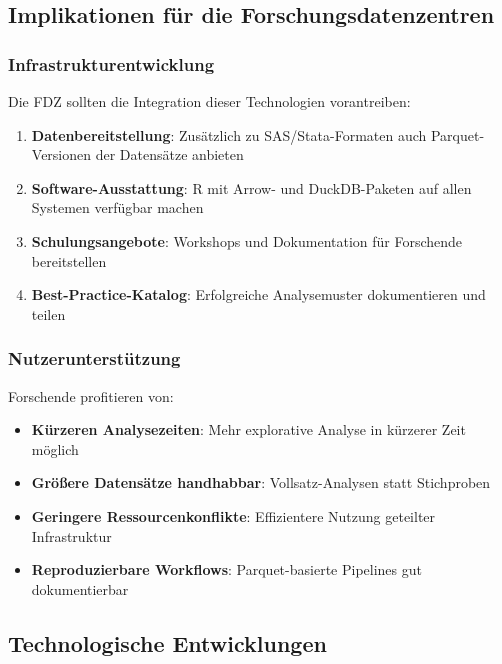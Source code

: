 \documentclass[
  ngerman,
  10pt,
  twocolumn]{article}
\providecommand{\tightlist}{%
  \setlength{\itemsep}{0pt}\setlength{\parskip}{0pt}}
\begin{document}
\subsection{Implikationen für die
Forschungsdatenzentren}\label{implikationen-fuxfcr-die-forschungsdatenzentren}

\subsubsection{Infrastrukturentwicklung}\label{infrastrukturentwicklung}

Die FDZ sollten die Integration dieser Technologien vorantreiben:

\begin{enumerate}
\def\labelenumi{\arabic{enumi}.}
\tightlist
\item
  \textbf{Datenbereitstellung}: Zusätzlich zu SAS/Stata-Formaten auch
  Parquet-Versionen der Datensätze anbieten
\item
  \textbf{Software-Ausstattung}: R mit Arrow- und DuckDB-Paketen auf
  allen Systemen verfügbar machen
\item
  \textbf{Schulungsangebote}: Workshops und Dokumentation für Forschende
  bereitstellen
\item
  \textbf{Best-Practice-Katalog}: Erfolgreiche Analysemuster
  dokumentieren und teilen
\end{enumerate}

\subsubsection{Nutzerunterstützung}\label{nutzerunterstuxfctzung}

Forschende profitieren von:

\begin{itemize}
\tightlist
\item
  \textbf{Kürzeren Analysezeiten}: Mehr explorative Analyse in kürzerer
  Zeit möglich
\item
  \textbf{Größere Datensätze handhabbar}: Vollsatz-Analysen statt
  Stichproben
\item
  \textbf{Geringere Ressourcenkonflikte}: Effizientere Nutzung geteilter
  Infrastruktur
\item
  \textbf{Reproduzierbare Workflows}: Parquet-basierte Pipelines gut
  dokumentierbar
\end{itemize}

\subsection{Technologische
Entwicklungen}\label{technologische-entwicklungen}
\end{document}

